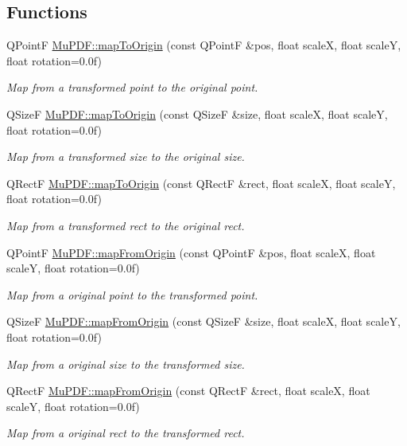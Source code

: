 \subsection*{Functions}
\begin{DoxyCompactItemize}
\item 
Q\-Point\-F \hyperlink{namespace_mu_p_d_f_a40833e5e56d0d7d44cba455e4186d5e4}{Mu\-P\-D\-F\-::map\-To\-Origin} (const Q\-Point\-F \&pos, float scale\-X, float scale\-Y, float rotation=0.\-0f)
\begin{DoxyCompactList}\small\item\em Map from a transformed point to the original point. \end{DoxyCompactList}\item 
Q\-Size\-F \hyperlink{namespace_mu_p_d_f_ae91a73bb4e3e4c10eb54c07ab9be9cf7}{Mu\-P\-D\-F\-::map\-To\-Origin} (const Q\-Size\-F \&size, float scale\-X, float scale\-Y, float rotation=0.\-0f)
\begin{DoxyCompactList}\small\item\em Map from a transformed size to the original size. \end{DoxyCompactList}\item 
Q\-Rect\-F \hyperlink{namespace_mu_p_d_f_a2132cae17dab8f9896ec0c83f0c2173c}{Mu\-P\-D\-F\-::map\-To\-Origin} (const Q\-Rect\-F \&rect, float scale\-X, float scale\-Y, float rotation=0.\-0f)
\begin{DoxyCompactList}\small\item\em Map from a transformed rect to the original rect. \end{DoxyCompactList}\item 
Q\-Point\-F \hyperlink{namespace_mu_p_d_f_ad849bcc678dd57c1f12619f9554e6aba}{Mu\-P\-D\-F\-::map\-From\-Origin} (const Q\-Point\-F \&pos, float scale\-X, float scale\-Y, float rotation=0.\-0f)
\begin{DoxyCompactList}\small\item\em Map from a original point to the transformed point. \end{DoxyCompactList}\item 
Q\-Size\-F \hyperlink{namespace_mu_p_d_f_a6c6cac36e5a30ed75952a619b19d33aa}{Mu\-P\-D\-F\-::map\-From\-Origin} (const Q\-Size\-F \&size, float scale\-X, float scale\-Y, float rotation=0.\-0f)
\begin{DoxyCompactList}\small\item\em Map from a original size to the transformed size. \end{DoxyCompactList}\item 
Q\-Rect\-F \hyperlink{namespace_mu_p_d_f_a2f2a28dce44170175d3e9ba9601478ea}{Mu\-P\-D\-F\-::map\-From\-Origin} (const Q\-Rect\-F \&rect, float scale\-X, float scale\-Y, float rotation=0.\-0f)
\begin{DoxyCompactList}\small\item\em Map from a original rect to the transformed rect. \end{DoxyCompactList}\end{DoxyCompactItemize}
